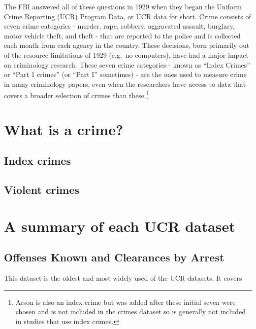 \documentclass[
  12pt,
  openany]{book}
\begin{document}
The FBI answered all of these questions in 1929 when they began the Uniform Crime Reporting (UCR) Program Data, or UCR data for short. Crime consists of seven crime categories - murder, rape, robbery, aggravated assault, burglary, motor vehicle theft, and theft - that are reported to the police and is collected each month from each agency in the country. These decisions, born primarily out of the resource limitations of 1929 (e.g.~no computers), have had a major impact on criminology research. These seven crime categories - known as ``Index Crimes'' or ``Part 1 crimes'' (or ``Part I'' sometimes) - are the ones used to measure crime in many criminology papers, even when the researchers have access to data that covers a broader selection of crimes than these.\footnote{Arson is also an index crime but was added after these initial seven were chosen and is not included in the crimes dataset so is generally not included in studies that use index crimes.}

\hypertarget{what-is-a-crime}{%
\section{What is a crime?}\label{what-is-a-crime}}

\hypertarget{index-crimes}{%
\subsection{Index crimes}\label{index-crimes}}

\hypertarget{violent-crimes}{%
\subsection{Violent crimes}\label{violent-crimes}}

\hypertarget{a-summary-of-each-ucr-dataset}{%
\section{A summary of each UCR dataset}\label{a-summary-of-each-ucr-dataset}}

\hypertarget{offenses-known-and-clearances-by-arrest}{%
\subsection{Offenses Known and Clearances by Arrest}\label{offenses-known-and-clearances-by-arrest}}

This dataset is the oldest and most widely used of the UCR datasets. It covers
\end{document}

